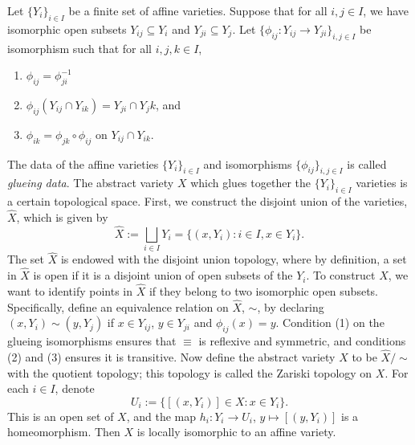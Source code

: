 \documentclass[12pt]{amsart}
\theoremstyle{plain}
\begin{document}
Let $\{Y_i\}_{i\in I}$ be a finite set of affine varieties.
Suppose that for all $i, j \in I$, we have isomorphic open subsets $Y_{ij} \subseteq Y_i$ and $Y_{ji} \subseteq Y_j$.
Let $\{\phi_{ij} : Y_{ij} \to Y_{ji}\}_{i, j \in I}$ be isomorphism such that for all $i, j, k \in I$,
\begin{enumerate}
\item
$\phi_{ij} = \phi_{ji}^{-1}$

\item
$\phi_{ij}(Y_{ij} \cap Y_{ik}) = Y_{ji} \cap Y_jk$, and

\item
$\phi_{ik} = \phi_{jk} \circ \phi_{ij}$ on $Y_{ij} \cap Y_{ik}$.
\end{enumerate}
The data of the affine varieties $\{Y_i\}_{i\in I}$ and isomorphisms $\{\phi_{ij}\}_{i,j\in I}$ is called \emph{glueing data}.
The abstract variety $X$ which glues together the $\{Y_i\}_{i\in I}$ varieties is a certain topological space.
First, we construct the disjoint union of the varieties, $\hat X$, which is given by
$$\hat X := \bigsqcup_{i \in I} Y_i = \{(x, Y_i) : i \in I, x \in Y_i\}.$$
The set $\hat X$ is endowed with the disjoint union topology, where by definition, a set in $\hat X$ is open if it is a disjoint union of open subsets of the $Y_i$.
To construct $X$, we want to identify points in $\hat X$ if they belong to two isomorphic open subsets.
Specifically, define an equivalence relation on $\hat X$, $\sim$, by declaring $(x, Y_i) \sim (y, Y_j)$ if $x \in Y_{ij}$, $y\in Y_{ji}$ and $\phi_{ij}(x) = y$.
Condition (1) on the glueing isomorphisms ensures that $\equiv$ is reflexive and symmetric, and conditions (2) and (3) ensures it is transitive.
Now define the abstract variety $X$ to be $\hat X / \sim$ with the quotient topology;
this topology is called the Zariski topology on $X$.
For each $i \in I$, denote
$$U_i := \{[(x, Y_i)] \in X : x \in Y_i\}.$$
This is an open set of $X$, and the map $h_i : Y_i \to U_i$, $y \mapsto [(y, Y_i)]$ is a homeomorphism.
Then $X$ is locally isomorphic to an affine variety.
\end{document}
